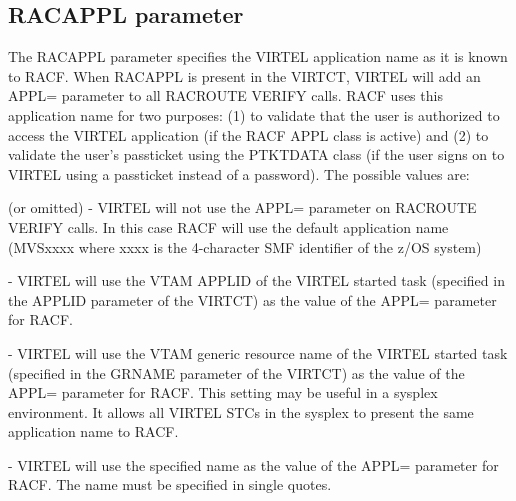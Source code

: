 \documentclass[letterpaper,10pt,english]{sphinxmanual}
\begin{document}
\ignorespaces 

\subsection{RACAPPL parameter}
\label{\detokenize{Installation_Guide:racappl-parameter}}\label{\detokenize{Installation_Guide:index-104}}
\begin{sphinxVerbatim}[commandchars=\\\{\}]
 
\end{sphinxVerbatim}

The RACAPPL parameter specifies the VIRTEL application name as it is known to RACF. When RACAPPL is present in the VIRTCT, VIRTEL will add an APPL= parameter to all RACROUTE VERIFY calls. RACF uses this application name for two purposes: (1) to validate that the user is authorized to access the VIRTEL application (if the RACF APPL class is active) and (2) to validate the user’s passticket using the PTKTDATA class (if the user signs on to VIRTEL using a passticket instead of a password). The possible values are:

 (or omitted) - VIRTEL will not use the APPL= parameter on RACROUTE VERIFY calls. In this case RACF will use the default application name (MVSxxxx where xxxx is the 4-character SMF identifier of the z/OS system)

 - VIRTEL will use the VTAM APPLID of the VIRTEL started task (specified in the APPLID parameter of the VIRTCT) as the value of the APPL= parameter for RACF.

 - VIRTEL will use the VTAM generic resource name of the VIRTEL started task (specified in the GRNAME parameter of the VIRTCT) as the value of the APPL= parameter for RACF. This setting may be useful in a sysplex environment. It allows all VIRTEL STCs in the sysplex to present the same application name to RACF.

 - VIRTEL will use the specified name as the value of the APPL= parameter for RACF. The name must be specified in single quotes.

\ignorespaces 
\end{document}
